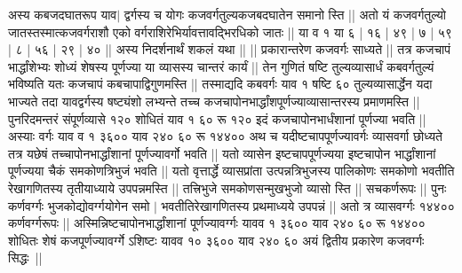 \documentclass[12pt]{article}
\begin{document}
\vskip15pt

\pstart
{\s [क्षेत्र]}
\pend

\vskip15pt

\pstart
{\s अस्य कबजदघातरूप याव$|$%
द्वर्गस्य च योगः
कजवर्गतुल्यकजबदघातेन समानो स्ति || अतो यं कजवर्गतुल्यो जातस्तस्मात्कजवर्गराशौ एको
वर्गराशिरेभिर्यावत्तावद्भिरधिको जातः ||
या व १ या ६ | १६ | ४९ | ७ | ५९ | ८ | ५६ | २९ | ४० ||
अस्य
निदर्शनार्थं शकलं यथा || ||
प्रकारान्तरेण कजवर्गः साध्यते || तत्र कजचापं
भार्द्धांशेभ्यः शोध्यं शेषस्य पूर्णज्या या व्यासस्य चान्तरं कार्यं ||
तेन
गुणितं षष्टि तुल्यव्यासार्धं कबवर्गतुल्यं भविष्यति
यतः कजचापं
कबचापाद्विगुणमस्ति ||
तस्माद्यदि कबवर्गः याव १ षष्टि ६० तुल्यव्यासार्द्धेन यदा
भाज्यते तदा यावद्वर्गस्य षष्ट्यंशो लभ्यन्ते तच्च
कजचापोनभार्द्धांशपूर्णज्याव्यासान्तरस्य प्रमाणमस्ति || पुनरिदमन्तरं
संपूर्णव्यासे १२० शोधितं याव १ ६० रू १२० इदं
कजचापोनभार्धंशानां पूर्णज्या भवति ||
अस्याः वर्गः याव व १ ३६०० याव
२४० ६० रू १४४०० अथ च यदीष्टचापपूर्णज्यावर्गः व्यासवर्गा छोध्यते तत्र यछेषं तच्चापोनभार्द्धांशानां पूर्णज्यावर्गो भवति ||
यतो व्यासेन इष्टचापपूर्णज्यया
इष्टचापोन भार्द्धांशानां पूर्णज्यया चैकं समकोणत्रिभुजं भवति ||
यतो वृत्तार्द्धे
व्यासप्रांता उत्पन्नत्रिभुजस्य पालिकोणः समकोणो भवतीति रेखागणितस्य तृतीयाध्याये उपपन्नमस्ति ||
तत्त्रिभुजे समकोणसन्मुखभुजो व्यासो स्ति || सचकर्णरूपः || पुनः
कर्णवर्ग्गः भुजकोद्योवर्ग्गयोगेन समो $|$ भवतीतिरेखागणितस्य
प्रथमाध्यये उपपन्नं || अतो त्र व्यासवर्ग्गः १४४०० कर्णवर्ग्गरूपः ||
अस्मिन्निष्टचापोन\-भार्द्धांशानां पूर्णज्यावर्ग्गः यावव १ ३६०० याव २४० ६० रू १४४०० शोधितः शेषं कजपूर्णज्यावर्ग्गे ऽशिष्टः यावव १० ३६०० याव २४० ६०
अयं द्वितीय प्रकारेण कजवर्ग्गः सिद्धः~||}
\pend
\end{document}
